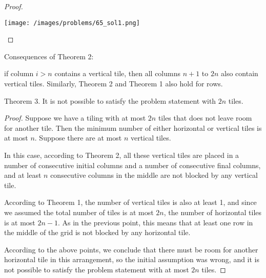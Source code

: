 \begin{solution}
\begin{proof}
\begin{center}
	\texttt{[image: /images/problems/65\_sol1.png]}
\end{center}
	
\end{proof}

Consequences of Theorem 2:

if column $i > n$ contains a vertical tile, then all columns $n+1$ to $2n$ also contain vertical tiles.
Similarly, Theorem 2 and Theorem 1 also hold for rows.

\begin{theorem} Theorem 3. It is not possible to satisfy the problem statement with $2n$ tiles.
\end{theorem}
\begin{proof}
Suppose we have a tiling with at most $2n$ tiles that does not leave room for another tile. Then the minimum number of either horizontal or vertical tiles is at most $n$. Suppose there are at most $n$ vertical tiles.

In this case, according to Theorem 2, all these vertical tiles are placed in a number of consecutive initial columns and a number of consecutive final columns, and at least $n$ consecutive columns in the middle are not blocked by any vertical tile.

According to Theorem 1, the number of vertical tiles is also at least 1, and since we assumed the total number of tiles is at most $2n$, the number of horizontal tiles is at most $2n - 1$. As in the previous point, this means that at least one row in the middle of the grid is not blocked by any horizontal tile.

According to the above points, we conclude that there must be room for another horizontal tile in this arrangement, so the initial assumption was wrong, and it is not possible to satisfy the problem statement with at most $2n$ tiles.
\end{proof}

\end{solution}

